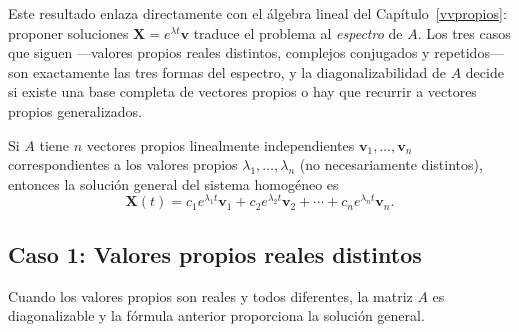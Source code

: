 \begin{rem}
Este resultado enlaza directamente con el álgebra lineal del Capítulo~\ref{vvpropios}: proponer soluciones $\mathbf{X}=e^{\lambda t}\mathbf{v}$ traduce el problema al \emph{espectro} de $A$. Los tres casos que siguen —valores propios reales distintos, complejos conjugados y repetidos— son exactamente las tres formas del espectro, y la diagonalizabilidad de $A$ decide si existe una base completa de vectores propios o hay que recurrir a vectores propios generalizados.
\end{rem}

\begin{theorem}\label{thm:cap29:solucion-general}
Si $A$ tiene $n$ vectores propios linealmente independientes $\mathbf{v}_1,\dots,\mathbf{v}_n$ correspondientes a los valores propios $\lambda_1,\dots,\lambda_n$ (no necesariamente distintos), entonces la solución general del sistema homogéneo es
\[
\mathbf{X}(t)=c_1 e^{\lambda_1 t}\mathbf{v}_1+c_2 e^{\lambda_2 t}\mathbf{v}_2+\cdots+c_n e^{\lambda_n t}\mathbf{v}_n.
\]
\end{theorem}

\subsection{Caso 1: Valores propios reales distintos}

Cuando los valores propios son reales y todos diferentes, la matriz $A$ es diagonalizable y la fórmula anterior proporciona la solución general.

